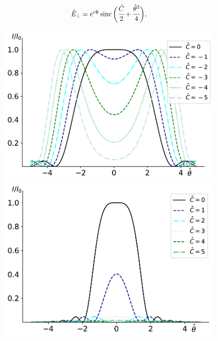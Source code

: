 \documentclass[14pt,a4paper]{extarticle}
\numberwithin{equation}{section}
\DeclareMathOperator{\sinc}{sinc}
\begin{document}
\begin{equation}
	\label{eq:field_dist_Norm}
	\begin{array}{lcl}
		\hat{E}_{\bot} = e^{i\Phi}
		\sinc\bigg(\cfrac{\hat{C}}{2} + 
		\cfrac{\hat{\theta}^2}{4}\bigg),
	\end{array}	
\end{equation}
\begin{figure}
	\centering  
	\begin{minipage}{0.49\textwidth}
		\centering
		\includegraphics[width=\textwidth]{pic/angleC_neg.pdf}
		\caption{}
		\label{fig:angle_dist_C_neg}
	\end{minipage}\hfill
	\begin{minipage}{0.49\textwidth}
		\centering
		\includegraphics[width=\textwidth]{pic/angleC_pos.pdf}
		\caption{}
		\label{fig:angle_dist_C_pos}
	\end{minipage}    
\end{figure}
\end{document}
